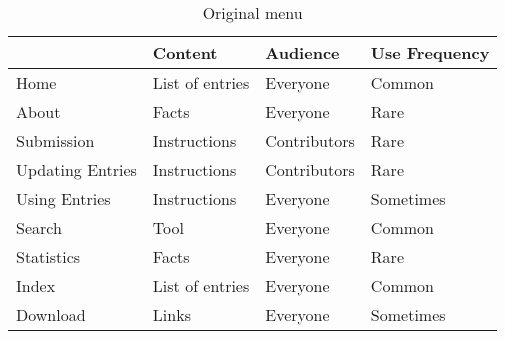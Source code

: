 \documentclass[bsc,frontabs,oneside,singlespacing,parskip,deptreport,logo]{infthesis}
\begin{document}
\begin{table}[h]
\centering
\begin{tabular}{|l|l|l|l|}
\hline
 & \textbf{Content} & \textbf{Audience} & \textbf{Use Frequency} \\ \hline
Home                   & List of entries  & Everyone          & Common                 \\ \hline
About                  & Facts            & Everyone          & Rare                   \\ \hline
Submission             & Instructions     & Contributors      & Rare                   \\ \hline
Updating Entries       & Instructions     & Contributors      & Rare                   \\ \hline
Using Entries          & Instructions     & Everyone          & Sometimes              \\ \hline
Search                 & Tool             & Everyone          & Common                 \\ \hline
Statistics             & Facts            & Everyone          & Rare                   \\ \hline
Index                  & List of entries  & Everyone          & Common                 \\ \hline
Download               & Links            & Everyone          & Sometimes              \\ \hline
\end{tabular}
\caption{Original menu}
\label{originalMenuOrder}
\end{table}
\end{document}
